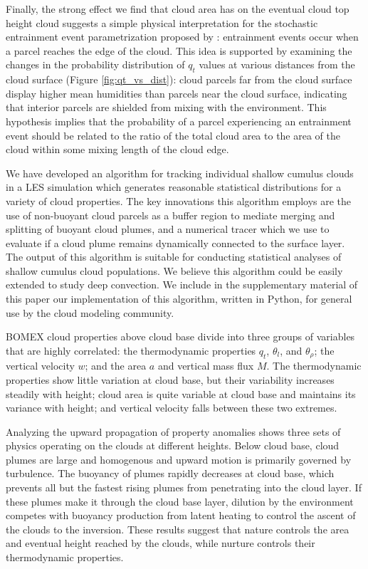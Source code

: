 \documentclass[acp]{copernicus}
\begin{document}
Finally, the strong effect we find that cloud area has on the eventual cloud 
top height cloud suggests a simple physical interpretation for the stochastic 
entrainment event parametrization proposed by \cite{Romps2010a}: entrainment 
events occur when a parcel reaches the edge of the cloud. This idea is 
supported by examining the changes in the probability distribution of $q_t$ 
values at various distances from the cloud surface (Figure 
\ref{fig:qt_vs_dist}): cloud parcels far from the cloud surface display higher
mean humidities than parcels near the cloud surface, indicating that interior 
parcels are shielded from mixing with the environment.  This hypothesis 
implies that the probability of a parcel experiencing an entrainment event 
should be related to the ratio of the total cloud area to the area of the 
cloud within some mixing length of the cloud edge.


\conclusions
We have developed an algorithm for tracking individual shallow cumulus clouds 
in a LES simulation which generates reasonable statistical distributions for a 
variety of cloud properties.  The key innovations this algorithm employs are 
the use of non-buoyant cloud parcels as a buffer region to mediate merging and 
splitting of buoyant cloud plumes, and a numerical tracer which we use to 
evaluate if a cloud plume remains dynamically connected to the surface layer.  
The output of this algorithm is suitable for conducting statistical 
analyses of shallow cumulus cloud populations.  We believe this algorithm could 
be easily extended to study deep convection.  We include in the supplementary 
material of this paper our implementation of this algorithm, written in Python, 
for general use by the cloud modeling community.

BOMEX cloud properties above cloud base divide into three groups of variables 
that are highly correlated: the thermodynamic properties $q_t$, $\theta_l$, 
and $\theta_\rho$; the vertical velocity $w$; and the area $a$ and vertical 
mass flux $M$.  The thermodynamic properties show little variation at cloud 
base, but their variability increases steadily with height; cloud area is 
quite variable at cloud base and maintains its variance with height; and 
vertical velocity falls between these two extremes.

Analyzing the upward propagation of property anomalies shows three sets of 
physics operating on the clouds at different heights.  Below cloud base, cloud 
plumes are large and homogenous and upward motion is primarily governed by 
turbulence.  The buoyancy of plumes rapidly decreases at cloud base, which 
prevents all but the fastest rising plumes from penetrating into the cloud 
layer.  If these plumes make it through the cloud base layer, dilution by the 
environment competes with buoyancy production from latent heating to control 
the ascent of the clouds to the inversion.  These results suggest that 
nature controls the area and eventual height reached by the clouds, while 
nurture controls their thermodynamic properties.
\end{document}
